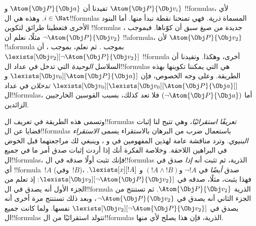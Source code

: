 \documentclass[../../../include/open-logic-section]{subfiles}
\begin{document}
تفيدنا  أن $\Atom{\Obj P}{\Obj a}$ و
$\Atom{\Obj P}{\Obj v_i}$ !!{formula}s، لأي $i \in \Nat$. وهذه هي
ال!!{formula}s المسماة \emph{ذرية}. فهي تمنحنا نقطة نبدأ منها. أما
البنود الأخرى فتعطينا طرائق لتكوين !!{formula}s جديدة من صيغ سبق أن
كوّناها. فبموجب ، مثلًا، نعلم أن
$\lnot \Atom{\Obj P}{\Obj v_2}$ !!a{formula}، لأن
$\Atom{\Obj P}{\Obj v_2}$ !!a{formula} بموجب
. ثم نعلم، بموجب ، أن
$\lexists[\Obj v_2][\lnot \Atom{\Obj P}{\Obj v_2}]$
!!{formula} أخرى، وهكذا. وتفيدنا  أن السلاسل
\emph{الوحيدة} التي تدخل في عداد ال!!{formula}s هي التي يمكننا تكوينها بهذه
الطريقة. وعلى وجه الخصوص، فإن
$\lexists[\Obj v_0][\Atom{\Obj P}{\Obj a}]$ و
$\lexists[\Obj v_0][\lexists[\Obj v_0][\Atom{\Obj P}{\Obj a}]]$
\emph{تدخلان} في عداد ال!!{formula}s، أما
$(\lnot \Atom{\Obj P}{\Obj a})$ فلا تعد كذلك، بسبب القوسين الخارجيين
الزائدين.

وتسمى هذه الطريقة في تعريف ال!!{formula}s \emph{تعريفًا استقرائيًا}،
وهي تتيح لنا إثبات قضايا عن ال!!{formula}s باستعمال ضرب من البرهان
بالاستقراء يسمى \emph{الاستقراء البنيوي}. وترد مناقشة عامة لهذين
المفهومين في  و
، وينبغي لك مراجعتهما قبل الخوض في البراهين
اللاحقة. وخلاصة الفكرة أنك إذا أردت إثبات صدق أمر ما في جميع
ال!!{formula}s، فإنك تثبت أولًا صدقه في ال!!{formula}s الذرية، ثم
تثبت أنه \emph{إذا} صدق في أي !!{formula}~$!A$ (وفي~$!B$)، صدق
\emph{أيضًا} في $\lnot !A$ و$(!A \land !B)$ و
$\lexists[x][!A]$. فهذا يثبت، مثلًا، صدقه في
$\lexists[\Obj v_2][\lnot \Atom{\Obj P}{\Obj v_2}]$: إذ تعلم من
الجزء الأول أنه يصدق في ال!!{formula} الذرية
$\Atom{\Obj P}{\Obj v_2}$. ثم تستنتج من الجزء الثاني أنه يصدق في
$\lnot \Atom{\Obj P}{\Obj v_2}$، وبعد ذلك تستنتج مرة أخرى أنه يصدق
في $\lexists[\Obj v_2][\lnot \Atom{\Obj P}{\Obj v_2}]$ نفسها. ولما
كانت جميع ال!!{formula}s تتولد استقرائيًا من ال!!{formula}s الذرية،
فإن هذا يصلح لأي منها.
\end{document}
